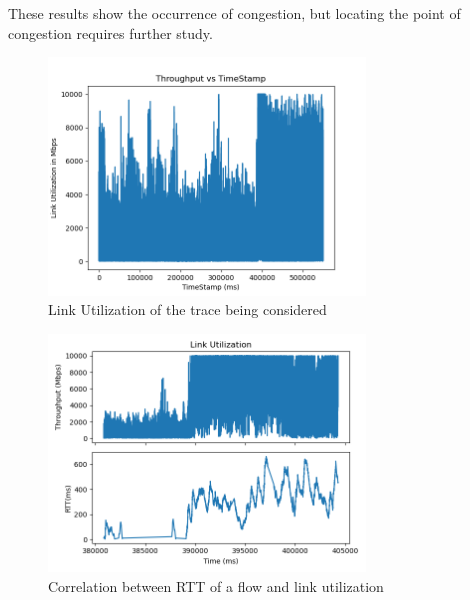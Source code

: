 These results show the occurrence of congestion, but locating the point of congestion requires further study.

\begin{figure}[t]
    \centering
        \includegraphics[width=0.75\textwidth]{Figures/link_util_satur.png}
    \caption[Link Utilization of the trace being considered]{Link Utilization of the trace being considered}
    \label{fig:linkutil_satur}
    \bigskip
\end{figure}

\begin{figure}[t]
    \centering
        \includegraphics[width=0.75\textwidth]{Figures/RTT_saturation.png}
    \caption[Correlation between RTT of a flow and link utilization]{Correlation between RTT of a flow and link utilization}
    \label{fig:corr}
    \bigskip
\end{figure}

